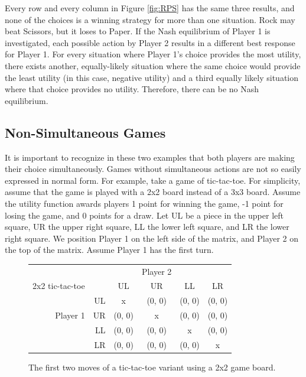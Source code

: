Every row and every column in Figure \ref{fig:RPS} has the same three results, and none of the choices is a winning strategy for more than one situation. Rock may beat Scissors, but it loses to Paper. If the Nash equilibrium of Player 1 is investigated, each possible action by Player 2 results in a different best response for Player 1. For every situation where Player 1's choice provides the most utility, there exists another, equally-likely situation where the same choice would provide the least utility (in this case, negative utility) and a third equally likely situation where that choice provides no utility. Therefore, there can be no Nash equilibrium.\\

\subsection{Non-Simultaneous Games}
It is important to recognize in these two examples that both players are making their choice simultaneously. Games without simultaneous actions are not so easily expressed in normal form. For example, take a game of tic-tac-toe. For simplicity, assume that the game is played with a 2x2 board instead of a 3x3 board. Assume the utility function awards players 1 point for winning the game, -1 point for losing the game, and 0 points for a draw. Let UL be a piece in the upper left square, UR the upper right square, LL the lower left square, and LR the lower right square. We position Player 1 on the left side of the matrix, and Player 2 on the top of the matrix. Assume Player 1 has the first turn.\\
\begin{figure}[H]
  \centering
  \begin{tabular}{r r | c | c | c | c |}
    &\multicolumn{1}{c}{}&\multicolumn{1}{c}{}&\multicolumn{1}{c}{Player 2}&\multicolumn{1}{c}{}\\
    \multicolumn{1}{c}{2x2 tic-tac-toe}&\multicolumn{1}{c}{}&\multicolumn{1}{c}{UL}&
    \multicolumn{1}{c}{UR}&\multicolumn{1}{c}{LL}&\multicolumn{1}{c}{LR}\\ \cline{3-6}
    & UL & x & (0, 0) & (0, 0) & (0, 0) \\ \cline{3-6}
    Player 1 & UR & (0, 0) & x & (0, 0) & (0, 0) \\ \cline{3-6}
    & LL & (0, 0) & (0, 0) & x & (0, 0) \\ \cline{3-6}
    & LR & (0, 0) & (0, 0) & (0, 0) & x \\ \cline{3-6}
  \end{tabular}
  \caption{The first two moves of a tic-tac-toe variant using a 2x2 game board.}
  \label{fig:2x2TTT}
\end{figure}

